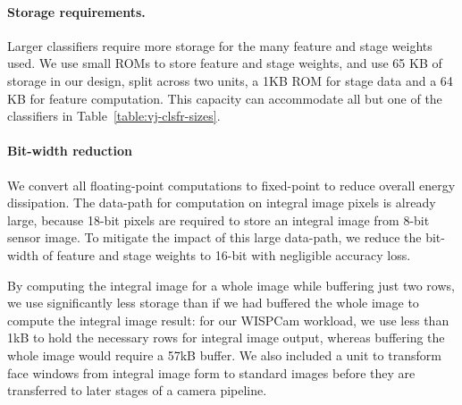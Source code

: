 \paragraph{Storage requirements.}
Larger classifiers require more storage for the many feature and stage weights used.
We use small ROMs to store feature and stage weights, and use 65 KB of storage in our design,
split across two units, a 1KB ROM for stage data and a 64 KB for feature computation. This capacity
can accommodate all but one of the classifiers in Table~\ref{table:vj-clsfr-sizes}.

\paragraph{Bit-width reduction} We convert all floating-point computations
to fixed-point to reduce overall energy dissipation. The
data-path for computation on integral image pixels is already large, because 18-bit pixels are
required to store an integral image from 8-bit sensor image. To mitigate the impact of this large data-path,
we reduce the bit-width of feature and stage weights to 16-bit with negligible accuracy loss.

By computing the integral image for a whole image while buffering just two rows, we use significantly less storage than if we had buffered the whole image to compute the integral image result: for our WISPCam workload, we use less than 1kB to hold the necessary rows for integral image output, whereas buffering the whole image would require a 57kB buffer.
We also included a unit to transform face windows from integral image form to standard images before they are transferred to later stages of a camera pipeline.





